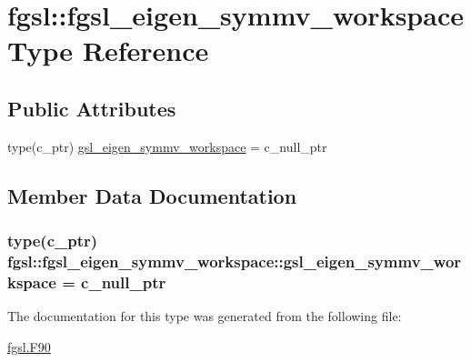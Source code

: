 \hypertarget{structfgsl_1_1fgsl__eigen__symmv__workspace}{\section{fgsl\-:\-:fgsl\-\_\-eigen\-\_\-symmv\-\_\-workspace Type Reference}
\label{structfgsl_1_1fgsl__eigen__symmv__workspace}
}
\subsection*{Public Attributes}
\begin{DoxyCompactItemize}
\item 
type(c\-\_\-ptr) \hyperlink{structfgsl_1_1fgsl__eigen__symmv__workspace_af4f6039413c7ee3bb9eb8e8ca9474ad4}{gsl\-\_\-eigen\-\_\-symmv\-\_\-workspace} = c\-\_\-null\-\_\-ptr
\end{DoxyCompactItemize}


\subsection{Member Data Documentation}
\hypertarget{structfgsl_1_1fgsl__eigen__symmv__workspace_af4f6039413c7ee3bb9eb8e8ca9474ad4}{
\subsubsection[{gsl\-\_\-eigen\-\_\-symmv\-\_\-workspace}]{\setlength{\rightskip}{0pt plus 5cm}type(c\-\_\-ptr) fgsl\-::fgsl\-\_\-eigen\-\_\-symmv\-\_\-workspace\-::gsl\-\_\-eigen\-\_\-symmv\-\_\-workspace = c\-\_\-null\-\_\-ptr}}\label{structfgsl_1_1fgsl__eigen__symmv__workspace_af4f6039413c7ee3bb9eb8e8ca9474ad4}


The documentation for this type was generated from the following file\-:\begin{DoxyCompactItemize}
\item 
\hyperlink{fgsl_8F90}{fgsl.\-F90}\end{DoxyCompactItemize}
